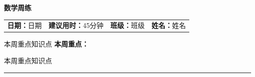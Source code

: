 \providecommand{\weekNumber}{}           %
\providecommand{\zhoukanDate}{日期}
\providecommand{\zhoukanClass}{班级}
\providecommand{\zhoukanStudent}{姓名}
\providecommand{\zhoukanMode}{limited}   %
\providecommand{\suggestedTime}{45分钟}  %
\providecommand{\weekFocus}{本周重点知识点} %
\providecommand{\mcqCount}{4}
\providecommand{\msqCount}{1}
\providecommand{\blankCount}{2}
\providecommand{\saqCount}{1}
\providecommand{\mcqItemSep}{0.3em}
\providecommand{\msqItemSep}{0.5em}
\providecommand{\blankItemSep}{0.8em}
\providecommand{\saqItemSep}{2.5cm}
\providecommand{\mcqTasksCols}{4}
\providecommand{\msqTasksCols}{2}


\begin{center}
    \LARGE\textbf{数学周练}
    \ifx\weekNumber\empty\else\ \weekNumber\fi
\end{center}
\vspace{0.5em}

\noindent\begin{tabular}{@{}p{}p{}p{}p{}@{}}
    \textbf{日期：}\zhoukanDate & \textbf{建议用时：}\suggestedTime & \textbf{班级：}\zhoukanClass & \textbf{姓名：}\zhoukanStudent \\
\end{tabular}

\ifx\weekFocus\empty\else
\vspace{0.5em}
\noindent\textbf{本周重点：}\par\weekFocus
\fi

\vspace{1em}
\hrule
\vspace{1em}


